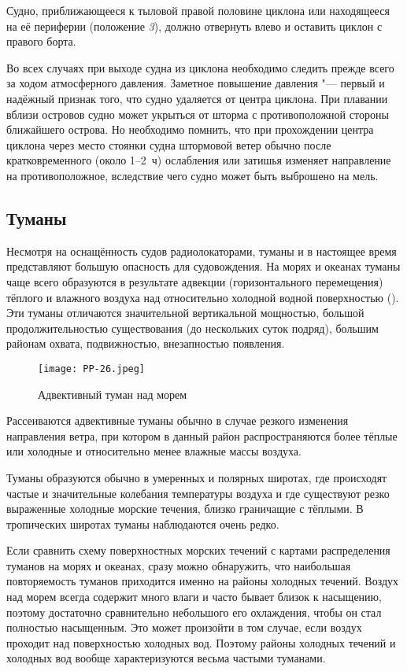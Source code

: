 Судно, приближающееся к тыловой правой половине циклона или
находящееся на её периферии (положение \textit{3}), должно отвернуть влево и
оставить циклон с правого борта.

Во всех случаях при выходе судна из циклона необходимо следить прежде
всего за ходом атмосферного давления. Заметное повышение давления "---
первый и надёжный признак того, что судно удаляется от центра
циклона. При плавании вблизи островов судно может укрыться от шторма с
противоположной стороны ближайшего острова. Но необходимо помнить, что
при прохождении центра циклона через место стоянки судна штормовой
ветер обычно после кратковременного (около 1--2~ч) ослабления или
затишья изменяет направление на противоположное, вследствие чего
судно может быть выброшено на мель.

\subsection{Туманы}

Несмотря на оснащённость судов радиолокаторами, туманы и в настоящее
время представляют большую опасность для судовождения. На морях и
океанах туманы чаще всего образуются в результате адвекции
(горизонтального перемещения) тёплого и влажного воздуха над
относительно холодной водной поверхностью (). Эти туманы
отличаются значительной вертикальной мощностью, большой
продолжительностью существования (до нескольких суток подряд), большим
районам охвата, подвижностью, внезапностью появления.

\begin{figure}[htb]
  \centering{}
  \texttt{[image: PP-26.jpeg]}
  \caption{Адвективный туман над морем}
  \label{fig:pp26}
  \small
  \centering{}
\end{figure}

Рассеиваются адвективные туманы обычно в случае резкого изменения
направления ветра, при котором в данный район распространяются более
тёплые или холодные и относительно менее влажные массы воздуха.

Туманы образуются обычно в умеренных и полярных широтах, где
происходят частые и значительные колебания температуры воздуха и где
существуют резко выраженные холодные морские течения, близко
граничащие с тёплыми. В тропических широтах туманы наблюдаются очень
редко.

Если сравнить схему поверхностных морских течений с картами
распределения туманов на морях и океанах, сразу можно обнаружить, что
наибольшая повторяемость туманов приходится именно на районы холодных
течений. Воздух над морем всегда содержит много влаги и часто бывает
близок к насыщению, поэтому достаточно сравнительно небольшого его
охлаждения, чтобы он стал полностью насыщенным. Это может произойти в
том случае, если воздух проходит над поверхностью холодных вод. Поэтому
районы холодных течений и холодных вод вообще характеризуются весьма
частыми туманами.

